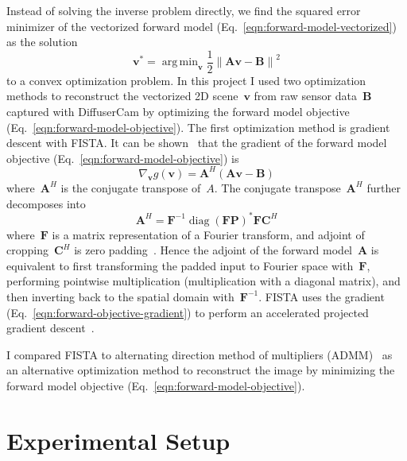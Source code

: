 \documentclass[final]{cvpr}
\DeclareMathOperator*{\argmin}{arg\,min}
\begin{document}
Instead of solving the inverse problem directly, we find the squared error
minimizer of the vectorized forward model
(Eq.~\ref{eqn:forward-model-vectorized}) as the solution
\begin{equation}
	\mathbf{v}^* = \argmin_\mathbf{v}\frac{1}{2}{\lVert\mathbf{A}\mathbf{v} - \mathbf{B}\rVert}^2
	\label{eqn:forward-model-objective}
\end{equation}
to a convex optimization problem.
In this project I used two optimization methods to reconstruct the vectorized
2D scene~$\mathbf{v}$ from raw sensor data~$\mathbf{B}$ captured with
DiffuserCam by optimizing the forward model objective
(Eq.~\ref{eqn:forward-model-objective}).
The first optimization method is gradient descent with FISTA\@.
It can be shown~\cite{biscarrat2018diffuseralgo} that the gradient of the
forward model objective (Eq.~\ref{eqn:forward-model-objective}) is
\begin{equation}
	\nabla_\mathbf{v}g(\mathbf{v}) = \mathbf{A}^H(\mathbf{A}\mathbf{v} - \mathbf{B})
	\label{eqn:forward-objective-gradient}
\end{equation}
where~$\mathbf{A}^H$ is the conjugate transpose of~$A$.
The conjugate transpose~$\mathbf{A}^H$ further decomposes into
\begin{equation}
	\mathbf{A}^H = \mathbf{F}^{-1}{\operatorname*{diag}(\mathbf{F}\mathbf{P})}^*\mathbf{F}\mathbf{C}^H
	\label{eqn:forward-model-conjugate-transpose}
\end{equation}
where~$\mathbf{F}$ is a matrix representation of a Fourier transform, and
adjoint of cropping~$\mathbf{C}^H$ is zero
padding~\cite{biscarrat2018diffuseralgo}.
Hence the adjoint of the forward model~$\mathbf{A}$ is equivalent to first
transforming the padded input to Fourier space with~$\mathbf{F}$, performing
pointwise multiplication (multiplication with a diagonal matrix), and then
inverting back to the spatial domain with~$\mathbf{F}^{-1}$.
FISTA uses the gradient (Eq.~\ref{eqn:forward-objective-gradient}) to perform
an accelerated projected gradient descent~\cite{beck2009fast}.

I compared FISTA to alternating direction method of multipliers (ADMM)~\cite{}
as an alternative optimization method to reconstruct the image by minimizing
the forward model objective (Eq.~\ref{eqn:forward-model-objective}).


\section{Experimental Setup}
\end{document}
